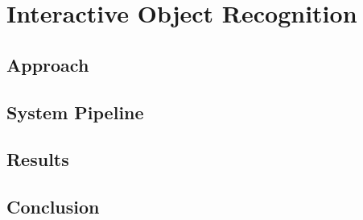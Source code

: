 \chapter{Interactive Object Recognition}
\label{chapter:Object Recognition}

\section{Approach}
\section{System Pipeline}
\section{Results}
\section{Conclusion}